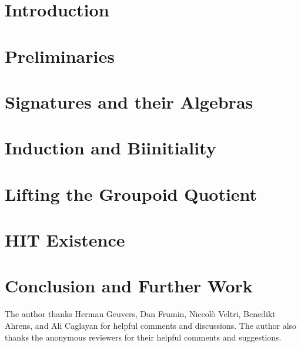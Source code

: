 \documentclass[screen]{acmart}
\theoremstyle{plain}
\theoremstyle{definition}
\begin{document}



\maketitle

\section{Introduction}


\section{Preliminaries}
\label{sec:prelims}


\section{Signatures and their Algebras}
\label{sec:signs}


\section{Induction and Biinitiality}
\label{sec:induction}


\section{Lifting the Groupoid Quotient}
\label{sec:biadj}


\section{HIT Existence}
\label{sec:existence}



\section{Conclusion and Further Work}
\label{sec:conclusion}



\begin{acks}
The author thanks Herman Geuvers, Dan Frumin, Niccol\`o Veltri, Benedikt Ahrens, and Ali Caglayan for helpful comments and discussions.
The author also thanks the anonymous reviewers for their helpful comments and suggestions.
\end{acks}



\end{document}
